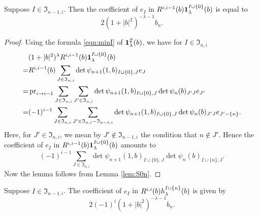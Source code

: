 \begin{lemma}
\label{lem:TeIpm}
Suppose $I \in {\mathfrak{I}}_{n-1,i}$.  
Then the coefficient of $e_{I}$
 in 
$
   R^{{i},{i-1}}(b) {\bf{1}}_{\lambda}^{I \cup \{0\}}(b)
$
is equal to
\[
   2(1+|b|^2)^{-\lambda-1}b_n.  
\]
\end{lemma}

\begin{proof}
Using  the formula \eqref{eqn:minI}
 of ${\bf{1}}_{\lambda}^{\mathcal{I}}(b)$, 
 we have for $I \in {\mathfrak{I}}_{n,i}$
\begin{align*}
& (1+|b|^2)^{\lambda} R^{{i},{i-1}}(b) {\bf{1}}_{\lambda}^{I\cup\{0\}}(b)
\\
=& R^{{i},{i-1}}(b) 
   \sum_{J \in {\mathfrak{I}}_{n,i}}
   \det \psi_{n+1}(1,b)_{I\cup\{0\}, J} e_J
\\
=& \operatorname{pr}_{{i}\to{i-1}} 
   \sum_{J \in {\mathfrak{I}}_{n,i}}
   \sum_{J' \in {\mathfrak{I}}_{n,i}}
   \det \psi_{n+1}(1,b)_{I\cup\{0\}, J} 
   \det \psi_{n}(b)_{J' J}
   e_{J'}
\\
=&(-1)^{i-1}\sum_{J \in {\mathfrak{I}}_{n,i}}
   \sum_{J' \in {\mathfrak{I}}_{n,i} - {\mathfrak{I}}_{n-1,i}}
   \det \psi_{n+1}(1,b)_{I\cup\{0\}, J} 
   \det \psi_{n}(b)_{J' J}
   e_{J' - \{n\}}.  
\end{align*}
Here, 
 for $J' \in {\mathfrak{I}}_{n,i}$, 
 we mean by $J' \not \in {\mathfrak{I}}_{n-1,i}$ the condition
 that $n \not \in J'$.  
Hence the coefficient of $e_I$
in 
$
   R^{{i},{i-1}}(b) {\bf{1}}_{\lambda}^{I \cup \{0\}}(b)
$
amounts to 
\[
(-1)^{i-1}\sum_{J \in {\mathfrak{I}}_{n,i}}
   \det \psi_{n+1}(1,b)_{I\cup\{0\}, J} 
   \det \psi_{n}(b)_{I\cup \{n\}, J}.  
\]
Now the lemma follows from Lemma \ref{lem:S0n}.  
\end{proof}


\begin{lemma}
\label{lem:eIpm}
Suppose $I \in {\mathfrak{I}}_{n-1,i}$.  
The coefficient of $e_I$
 in 
$
  R^{{i},{i}} (b) h_{\lambda}^{I \cup \{n\}}(b)
$
is given by 
\[
  2(-1)^i (1+|b|^2)^{-\lambda-1}b_n.  
\]
\end{lemma}

